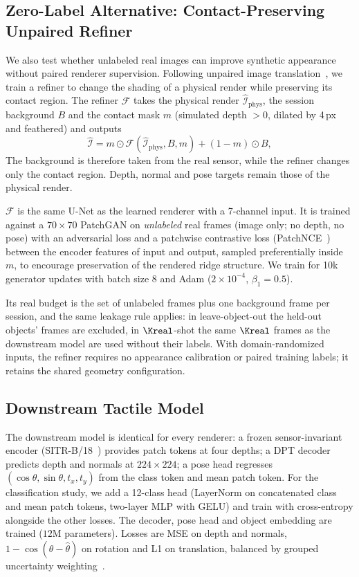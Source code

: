 \subsection{Zero-Label Alternative: Contact-Preserving Unpaired Refiner}
\label{sec:refiner}
We also test whether unlabeled real images can improve synthetic appearance without paired renderer supervision. Following unpaired image translation~\cite{shrivastava2017simgan,park2020cut,chen2022cyclegan}, we train a refiner to change the shading of a physical render while preserving its contact region. The refiner $\mathcal{F}$ takes the physical render $\hat{\mathcal{I}}_{\mathrm{phys}}$, the session background $B$ and the contact mask $m$ (simulated depth $>0$, dilated by 4\,px and feathered) and outputs
\begin{equation}
    \hat{\mathcal{I}} = m \odot \mathcal{F}(\hat{\mathcal{I}}_{\mathrm{phys}}, B, m) + (1-m) \odot B ,
\end{equation}
The background is therefore taken from the real sensor, while the refiner changes only the contact region. Depth, normal and pose targets remain those of the physical render.

 $\mathcal{F}$ is the same U-Net as the learned renderer with a 7-channel input. It is trained against a $70\times70$ PatchGAN on \emph{unlabeled} real frames (image only; no depth, no pose) with an adversarial loss and a patchwise contrastive loss (PatchNCE~\cite{park2020cut}) between the encoder features of input and output, sampled preferentially inside $m$, to encourage preservation of the rendered ridge structure. We train for 10k generator updates with batch size 8 and Adam ($2\times10^{-4}$, $\beta_1=0.5$).

Its real budget is the set of unlabeled frames plus one background frame per session, and the same leakage rule applies: in leave-object-out the held-out objects' frames are excluded, in $\Kreal$-shot the same $\Kreal$ frames as the downstream model are used without their labels. With domain-randomized inputs, the refiner requires no appearance calibration or paired training labels; it retains the shared geometry configuration.

\subsection{Downstream Tactile Model}
The downstream model is identical for every renderer: a frozen sensor-invariant encoder (SITR-B/18~\cite{gupta2025sitr}) provides patch tokens at four depths; a DPT decoder~\cite{ranftl2021dpt} predicts depth and normals at $224\times224$; a pose head regresses $(\cos\theta,\sin\theta,t_x,t_y)$ from the class token and mean patch token. For the classification study, we add a 12-class head (LayerNorm on concatenated class and mean patch tokens, two-layer MLP with GELU) and train with cross-entropy alongside the other losses. The decoder, pose head and object embedding are trained ($12$M parameters). Losses are MSE on depth and normals, $1-\cos(\theta-\hat\theta)$ on rotation and L1 on translation, balanced by grouped uncertainty weighting~\cite{kendall2018multi}.

